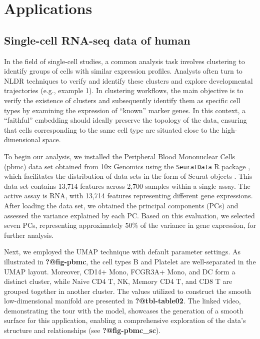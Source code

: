 \documentclass[
  12pt]{article}
\begin{document}
\hypertarget{sec-applications}{%
\section{Applications}\label{sec-applications}}

\hypertarget{single-cell-rna-seq-data-of-human}{%
\subsection{Single-cell RNA-seq data of
human}\label{single-cell-rna-seq-data-of-human}}

In the field of single-cell studies, a common analysis task involves
clustering to identify groups of cells with similar expression profiles.
Analysts often turn to NLDR techniques to verify and identify these
clusters and explore developmental trajectories (e.g., example 1). In
clustering workflows, the main objective is to verify the existence of
clusters and subsequently identify them as specific cell types by
examining the expression of ``known'' marker genes. In this context, a
``faithful'' embedding should ideally preserve the topology of the data,
ensuring that cells corresponding to the same cell type are situated
close to the high-dimensional space.

To begin our analysis, we installed the Peripheral Blood Mononuclear
Cells (pbmc) data set obtained from 10x Genomics using the
\texttt{SeuratData} R package \citep{Rahul2019}, which facilitates the
distribution of data sets in the form of Seurat objects
\citep{Yuhan2021}. This data set contains 13,714 features across 2,700
samples within a single assay. The active assay is RNA, with 13,714
features representing different gene expressions. After loading the data
set, we obtained the principal components (PCs) and assessed the
variance explained by each PC. Based on this evaluation, we selected
seven PCs, representing approximately 50\% of the variance in gene
expression, for further analysis.

Next, we employed the UMAP technique with default parameter settings. As
illustrated in \textbf{?@fig-pbmc}, the cell types B and Platelet are
well-separated in the UMAP layout. Moreover, CD14+ Mono, FCGR3A+ Mono,
and DC form a distinct cluster, while Naive CD4 T, NK, Memory CD4 T, and
CD8 T are grouped together in another cluster. The values utilized to
construct the smooth low-dimensional manifold are presented in
\textbf{?@tbl-table02}. The linked video, demonstrating the tour with
the model, showcases the generation of a smooth surface for this
application, enabling a comprehensive exploration of the data's
structure and relationships (see \textbf{?@fig-pbmc\_sc}).
\end{document}
